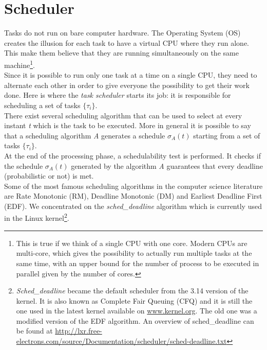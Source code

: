 \section{Scheduler}
Tasks do not run on bare computer hardware. The Operating System (OS) creates the illusion for each task to have a virtual CPU where they run alone. This make them believe that they are running simultaneously on the same machine\footnote{This is true if we think of a single CPU with one core. Modern CPUs are multi-core, which gives the possibility to actually run multiple tasks at the same time, with an upper bound for the number of process to be executed in parallel given by the number of cores.}.\\
Since it is possible to run only one task at a time on a single CPU, they need to alternate each other in order to give everyone the possibility to get their work done. Here is where the \emph{task scheduler} starts its job: it is responsible for scheduling a set of tasks \( \{\tau_{i}\} \).\\
There exist several scheduling algorithm that can be used to select at every instant \emph{t} which is the task to be executed. More in general it is possible to say that a scheduling algorithm \emph{A} generates a schedule \( \sigma_{A}\left(t\right) \) starting from a set of tasks \( \{\tau_{i}\} \).\\
At the end of the processing phase, a schedulability test is performed. It checks if the schedule \( \sigma_{A}\left(t\right) \) generated by the algorithm \emph{A} guarantees that every deadline (probabilistic or not) is met.\\
Some of the most famous scheduling algorithms in the computer science literature are Rate Monotonic (RM), Deadline Monotonic (DM) and Earliest Deadline First (EDF). We concentrated on the \emph{sched\_deadline} algorithm which is currently used in the Linux kernel\footnote{\emph{Sched\_deadline} became the default scheduler from the 3.14 version of the kernel. It is also known as Complete Fair Queuing (CFQ) and it is still the one used in the latest kernel available on \url{www.kernel.org}. The old one was a modified version of the EDF algorithm. An overview of sched\_deadline can be found at \url{http://lxr.free-electrons.com/source/Documentation/scheduler/sched-deadline.txt}}.

